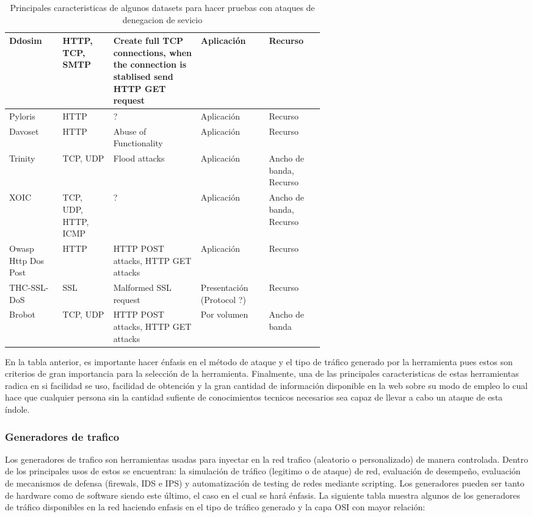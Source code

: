 \documentclass[12pt]{article}
\begin{document}
\begin{table}[htbp]
\begin{tabular}{|p{0.1\linewidth}|p{0.1\linewidth}|p{0.2\linewidth}|p{0.1\linewidth}|p{0.1\linewidth}|}
Ddosim &
HTTP, TCP, SMTP & 
Create full TCP connections, when the connection is stablised send HTTP GET request & 
Aplicación & 
Recurso
\tabularnewline \hline

Pyloris &
HTTP & 
? & 
Aplicación & 
Recurso
\tabularnewline \hline

Davoset &
HTTP & 
Abuse of Functionality & 
Aplicación & 
Recurso
\tabularnewline \hline

Trinity &
TCP, UDP & 
Flood attacks & 
Aplicación & 
Ancho de banda, Recurso
\tabularnewline \hline

XOIC &
TCP, UDP, HTTP,  ICMP & 
? & 
Aplicación & 
Ancho de banda, Recurso
\tabularnewline \hline

Owasp Http Dos Post &
HTTP & 
HTTP POST attacks, HTTP GET attacks & 
Aplicación & 
Recurso
\tabularnewline \hline

THC-SSL-DoS &
SSL & 
Malformed SSL request & 
Presentación (Protocol ?) & 
Recurso
\tabularnewline \hline

Brobot &
TCP, UDP & 
HTTP POST attacks, HTTP GET attacks &  
Por volumen & 
Ancho de banda
\tabularnewline \hline

\end{tabular}
\caption{Principales caracteristicas de algunos datasets para hacer pruebas con ataques de denegacion de sevicio} \label{tab:sometab}
\end{table} 

En la tabla anterior, es importante hacer énfasis en el método de ataque y el tipo de tráfico generado por la herramienta pues estos son criterios de gran importancia para la selección de la herramienta. Finalmente, una de las principales caracteristicas de estas herramientas radica en si facilidad se uso, facilidad de obtención y la gran cantidad de información disponible en la web sobre su modo de empleo lo cual hace que cualquier persona sin la cantidad sufiente de conocimientos tecnicos necesarios sea capaz de llevar a cabo un ataque de esta índole.

\subsubsection{Generadores de trafico}

Los generadores de trafico  son herramientas usadas para inyectar en la red trafico (aleatorio o personalizado) de manera controlada. Dentro de los principales usos de estos se encuentran: la simulación de tráfico (legitimo o de ataque) de red, evaluación de desempeño, evaluación de mecanismos de defensa (firewals, IDS e IPS) y automatización de testing de redes mediante scripting. Los generadores pueden ser tanto de hardware como de software siendo este último, el caso en el cual se hará énfasis. La siguiente tabla muestra algunos de los generadores de tráfico disponibles en la red \citep{dos_tools} haciendo enfasis en el tipo de tráfico generado y la capa OSI con mayor relación:
\end{document}
